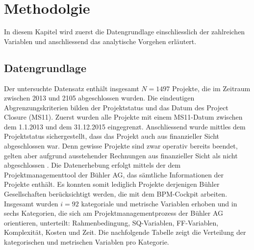 \chapter{Methodolgie}\label{sec:methode}
In diesem Kapitel wird zuerst die Datengrundlage einschliesslich der zahlreichen Variablen und anschliessend das analytische Vorgehen erläutert.  
\section{Datengrundlage}\label{sec:datagr}
Der untersuchte Datensatz enthält insgesamt $N = 1497$ Projekte, die im Zeitraum zwischen 2013 und 2105 abgeschlossen wurden. Die eindeutigen Abgrenzungskriterien bilden der Projektstatus und das Datum des Project Closure (MS11). Zuerst wurden alle Projekte mit einem MS11-Datum zwischen dem 1.1.2013 und dem 31.12.2015 eingegrenzt. Anschliessend wurde mittles dem Projektstatus sichergestellt, dass das Projekt auch aus finanzieller Sicht abgeschlossen war. Denn gewisse Projekte sind zwar operativ bereits beendet, gelten aber aufgrund ausstehender Rechnungen aus finanzieller Sicht als \glqq nicht abgeschlossen \grqq{}. Die Datenerhebung erfolgt mittels der dem Projektmanagementtool der Bühler AG, das sämtliche Informationen der Projekte enthält. Es konnten somit lediglich Projekte derjenigen Bühler Gesellschaften berücksichtigt werden, die mit dem BPM-Cockpit arbeiten.
\newline\newline
Insgesamt wurden $i = 92$ kategoriale und metrische Variablen erhoben und in sechs Kategorien, die sich am Projektmanagementprozess der Bühler AG orientieren, unterteilt: Rahmenbedingung, SQ-Variablen, FF-Variablen, Komplexität, Kosten und Zeit. Die nachfolgende Tabelle zeigt die Verteilung der kategorischen und metrischen Variablen pro Kategorie.
